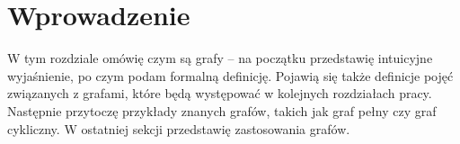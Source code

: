 \chapter{Wprowadzenie}

W tym rozdziale omówię czym są grafy -- na początku przedstawię intuicyjne wyjaśnienie, po czym podam formalną definicję. Pojawią się także definicje pojęć związanych z grafami, które będą występować w kolejnych rozdziałach pracy. Następnie przytoczę przykłady znanych grafów, takich jak graf pełny czy graf cykliczny. W ostatniej sekcji przedstawię zastosowania grafów.





